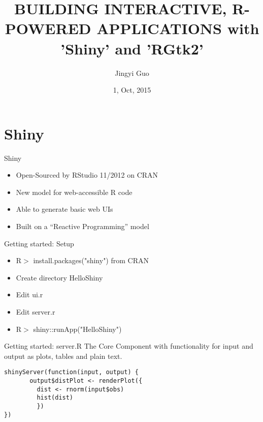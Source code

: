\documentclass[compress]{beamer}
\title[Shiny and RGtk2 \hspace{35mm} \insertframenumber/\inserttotalframenumber]{BUILDING INTERACTIVE, R-POWERED APPLICATIONS with 'Shiny' and 'RGtk2'}
\author[Jingyi Guo]{Jingyi Guo}
\institute{}
\date{1, Oct, 2015}
\begin{document}
\begin{frame}
\titlepage
\vspace{-5mm}
\begin{flushright}
\end{flushright}
\end{frame}




\section[Shiny]{Shiny}
\begin{frame}{Shiny}
\begin{itemize}
  \item Open-Sourced by RStudio 11/2012 on CRAN
  \item New model for web-accessible R code
  \item Able to generate basic web UIs
  \item Built on a ``Reactive Programming'' model
\end{itemize}
\end{frame}

\begin{frame}{Getting started: Setup}
\begin{itemize}
  \item \alert{R$>$ install.packages("shiny")} from CRAN
  \item Create directory \alert{HelloShiny}
  \item Edit \alert{ui.r}
  \item Edit \alert{server.r}
  \item \alert{R$>$ shiny::runApp("HelloShiny")}
\end{itemize}
\end{frame}


\begin{frame}[fragile]{Getting started: server.R}
The Core Component with functionality for input and output as plots, tables and plain text.
\begin{tcolorbox}[colback=green!5,colframe=green!40!black]
\begin{verbatim}
shinyServer(function(input, output) {
       output$distPlot <- renderPlot({
         dist <- rnorm(input$obs)
         hist(dist)
         })
})
\end{verbatim}
\end{tcolorbox}
\end{frame}
\end{document}
